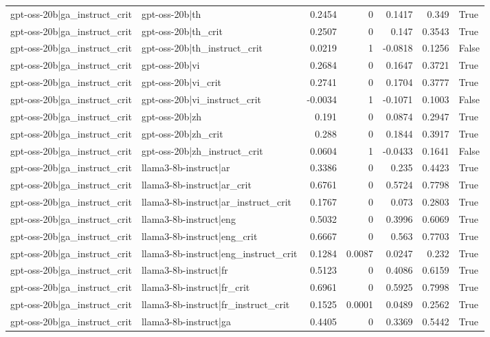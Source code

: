 \begin{table}
\begin{tabular}{l l r r r r l}
gpt-oss-20b|ga_instruct_crit & gpt-oss-20b|th & 0.2454 & 0 & 0.1417 & 0.349 & True \\
gpt-oss-20b|ga_instruct_crit & gpt-oss-20b|th_crit & 0.2507 & 0 & 0.147 & 0.3543 & True \\
gpt-oss-20b|ga_instruct_crit & gpt-oss-20b|th_instruct_crit & 0.0219 & 1 & -0.0818 & 0.1256 & False \\
gpt-oss-20b|ga_instruct_crit & gpt-oss-20b|vi & 0.2684 & 0 & 0.1647 & 0.3721 & True \\
gpt-oss-20b|ga_instruct_crit & gpt-oss-20b|vi_crit & 0.2741 & 0 & 0.1704 & 0.3777 & True \\
gpt-oss-20b|ga_instruct_crit & gpt-oss-20b|vi_instruct_crit & -0.0034 & 1 & -0.1071 & 0.1003 & False \\
gpt-oss-20b|ga_instruct_crit & gpt-oss-20b|zh & 0.191 & 0 & 0.0874 & 0.2947 & True \\
gpt-oss-20b|ga_instruct_crit & gpt-oss-20b|zh_crit & 0.288 & 0 & 0.1844 & 0.3917 & True \\
gpt-oss-20b|ga_instruct_crit & gpt-oss-20b|zh_instruct_crit & 0.0604 & 1 & -0.0433 & 0.1641 & False \\
gpt-oss-20b|ga_instruct_crit & llama3-8b-instruct|ar & 0.3386 & 0 & 0.235 & 0.4423 & True \\
gpt-oss-20b|ga_instruct_crit & llama3-8b-instruct|ar_crit & 0.6761 & 0 & 0.5724 & 0.7798 & True \\
gpt-oss-20b|ga_instruct_crit & llama3-8b-instruct|ar_instruct_crit & 0.1767 & 0 & 0.073 & 0.2803 & True \\
gpt-oss-20b|ga_instruct_crit & llama3-8b-instruct|eng & 0.5032 & 0 & 0.3996 & 0.6069 & True \\
gpt-oss-20b|ga_instruct_crit & llama3-8b-instruct|eng_crit & 0.6667 & 0 & 0.563 & 0.7703 & True \\
gpt-oss-20b|ga_instruct_crit & llama3-8b-instruct|eng_instruct_crit & 0.1284 & 0.0087 & 0.0247 & 0.232 & True \\
gpt-oss-20b|ga_instruct_crit & llama3-8b-instruct|fr & 0.5123 & 0 & 0.4086 & 0.6159 & True \\
gpt-oss-20b|ga_instruct_crit & llama3-8b-instruct|fr_crit & 0.6961 & 0 & 0.5925 & 0.7998 & True \\
gpt-oss-20b|ga_instruct_crit & llama3-8b-instruct|fr_instruct_crit & 0.1525 & 0.0001 & 0.0489 & 0.2562 & True \\
gpt-oss-20b|ga_instruct_crit & llama3-8b-instruct|ga & 0.4405 & 0 & 0.3369 & 0.5442 & True \\

\end{tabular}
\end{table}
